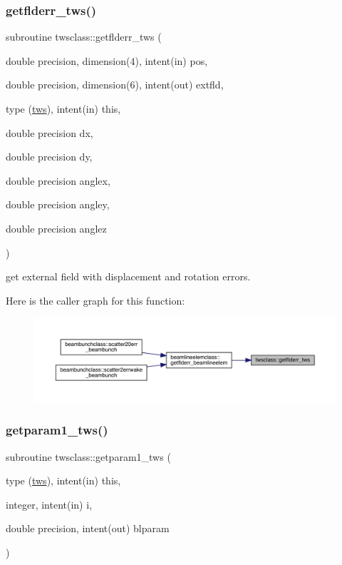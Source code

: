 \subsubsection{\texorpdfstring{getflderr\_tws()}{getflderr\_tws()}}
{\footnotesize\ttfamily subroutine twsclass\+::getflderr\+\_\+tws (\begin{DoxyParamCaption}\item[{double precision, dimension(4), intent(in)}]{pos,  }\item[{double precision, dimension(6), intent(out)}]{extfld,  }\item[{type (\mbox{\hyperlink{namespacetwsclass_structtwsclass_1_1tws}{tws}}), intent(in)}]{this,  }\item[{double precision}]{dx,  }\item[{double precision}]{dy,  }\item[{double precision}]{anglex,  }\item[{double precision}]{angley,  }\item[{double precision}]{anglez }\end{DoxyParamCaption})}



get external field with displacement and rotation errors. 

Here is the caller graph for this function\+:\nopagebreak
\begin{figure}[H]
\begin{center}
\leavevmode
\includegraphics[width=350pt]{namespacetwsclass_aaf9be4899e2515903618d2a1ab1dfbbc_icgraph}
\end{center}
\end{figure}
\mbox{\label{namespacetwsclass_ac410f8e4606b3fdf3303f0976a2115dc}} 
\subsubsection{\texorpdfstring{getparam1\_tws()}{getparam1\_tws()}}
{\footnotesize\ttfamily subroutine twsclass\+::getparam1\+\_\+tws (\begin{DoxyParamCaption}\item[{type (\mbox{\hyperlink{namespacetwsclass_structtwsclass_1_1tws}{tws}}), intent(in)}]{this,  }\item[{integer, intent(in)}]{i,  }\item[{double precision, intent(out)}]{blparam }\end{DoxyParamCaption})}

